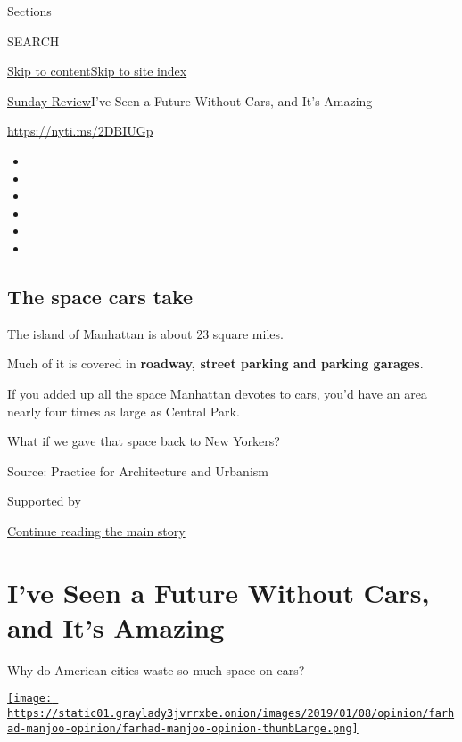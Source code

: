 Sections

SEARCH

\protect\hyperlink{site-content}{Skip to
content}\protect\hyperlink{site-index}{Skip to site index}

\href{/section/opinion/sunday}{Sunday Review}\textbar{}I've Seen a
Future Without Cars, and It's Amazing

\url{https://nyti.ms/2DBIUGp}

\begin{itemize}
\item
\item
\item
\item
\item
\item
\end{itemize}

\hypertarget{the-space-cars-take}{%
\subsection{The space cars take}\label{the-space-cars-take}}

The island of Manhattan is about 23 square miles.

Much of it is covered in \textbf{roadway, street parking and parking
garages}.

If you added up all the space Manhattan devotes to cars, you'd have an
area nearly four times as large as Central Park.

What if we gave that space back to New Yorkers?

Source: Practice for Architecture and Urbanism

Supported by

\protect\hyperlink{after-sponsor}{Continue reading the main story}

\hypertarget{ive-seen-a-future-without-cars-and-its-amazing}{%
\section{I've Seen a Future Without Cars, and It's
Amazing}\label{ive-seen-a-future-without-cars-and-its-amazing}}

Why do American cities waste so much space on cars?

\href{https://www.nytimes3xbfgragh.onion/by/farhad-manjoo}{\texttt{[image: https://static01.graylady3jvrrxbe.onion/images/2019/01/08/opinion/farhad-manjoo-opinion/farhad-manjoo-opinion-thumbLarge.png]}}

